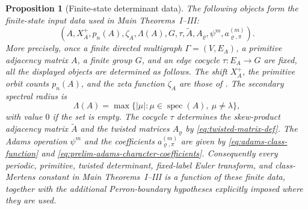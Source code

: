 \documentclass[11pt,a4paper]{amsart}
\theoremstyle{plain}
\newtheorem{proposition}[theorem]{Proposition}
\theoremstyle{definition}
\theoremstyle{remark}
\DeclareMathOperator{\spec}{spec}
\begin{document}
\begin{proposition}[Finite-state determinant data]
  \label{prop:finite-state-data-collection}
  \label{prop:finite-state-data-package}
The following objects form the finite-state input data used in
  Main Theorems~I--III:
  \[
    (A,X_A^+,p_n(A),\zeta_A,\Lambda(A),G,\tau,
      \widetilde A,A_\varrho,\psi^m,a_{\varrho,
      \pi}^{(m)}) .
  \]
  More precisely, once a finite directed multigraph \(\Gamma=(V,E_A)\),
  a primitive adjacency matrix \(A\), a finite group \(G\), and an edge
  cocycle \(\tau:E_A\to G\) are fixed, all the displayed objects are
  determined as follows. The shift \(X_A^+\), the primitive orbit counts
  \(p_n(A)\), and the zeta function \(\zeta_A\) are those of
  . The secondary spectral radius is
  \[
    \Lambda(A)=\max\{|\mu|:\mu\in\spec(A),\ \mu\neq\lambda\},
  \]
  with value \(0\) if the set is empty. The cocycle \(\tau\) determines
  the skew-product adjacency matrix \(\widetilde A\) and the twisted
  matrices \(A_\varrho\) by \eqref{eq:twisted-matrix-def}. The Adams
  operation \(\psi^m\) and the coefficients
  \(a_{\varrho,\pi}^{(m)}\) are given by
  \eqref{eq:adams-class-function} and
  \eqref{eq:prelim-adams-character-coefficients}. Consequently every
  periodic, primitive, twisted determinant, fixed-label Euler transform,
and class-Mertens constant in Main Theorems~I--III is a function of
these finite data, together with the additional Perron-boundary
  hypotheses explicitly imposed where they are used.
\end{proposition}
\end{document}
